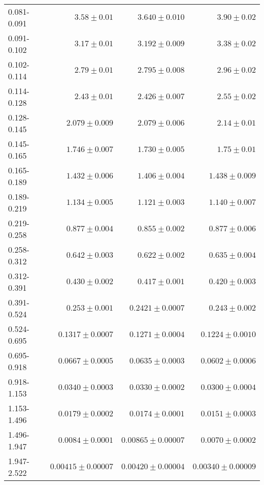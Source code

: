 \begin{table}
\begin{center}
\begin{tabular}{@{}l r r r@{}}
            0.081-0.091  &  $3.58     \pm  0.01$     &  $3.640    \pm  0.010$    &  $3.90     \pm  0.02$     \\
            0.091-0.102  &  $3.17     \pm  0.01$     &  $3.192    \pm  0.009$    &  $3.38     \pm  0.02$     \\
            0.102-0.114  &  $2.79     \pm  0.01$     &  $2.795    \pm  0.008$    &  $2.96     \pm  0.02$     \\
            0.114-0.128  &  $2.43     \pm  0.01$     &  $2.426    \pm  0.007$    &  $2.55     \pm  0.02$     \\
            0.128-0.145  &  $2.079    \pm  0.009$    &  $2.079    \pm  0.006$    &  $2.14     \pm  0.01$     \\
            0.145-0.165  &  $1.746    \pm  0.007$    &  $1.730    \pm  0.005$    &  $1.75     \pm  0.01$     \\
            0.165-0.189  &  $1.432    \pm  0.006$    &  $1.406    \pm  0.004$    &  $1.438    \pm  0.009$    \\
            0.189-0.219  &  $1.134    \pm  0.005$    &  $1.121    \pm  0.003$    &  $1.140    \pm  0.007$    \\
            0.219-0.258  &  $0.877    \pm  0.004$    &  $0.855    \pm  0.002$    &  $0.877    \pm  0.006$    \\
            0.258-0.312  &  $0.642    \pm  0.003$    &  $0.622    \pm  0.002$    &  $0.635    \pm  0.004$    \\
            0.312-0.391  &  $0.430    \pm  0.002$    &  $0.417    \pm  0.001$    &  $0.420    \pm  0.003$    \\
            0.391-0.524  &  $0.253    \pm  0.001$    &  $0.2421   \pm  0.0007$   &  $0.243    \pm  0.002$    \\
            0.524-0.695  &  $0.1317   \pm  0.0007$   &  $0.1271   \pm  0.0004$   &  $0.1224   \pm  0.0010$   \\
            0.695-0.918  &  $0.0667   \pm  0.0005$   &  $0.0635   \pm  0.0003$   &  $0.0602   \pm  0.0006$   \\
            0.918-1.153  &  $0.0340   \pm  0.0003$   &  $0.0330   \pm  0.0002$   &  $0.0300   \pm  0.0004$   \\
            1.153-1.496  &  $0.0179   \pm  0.0002$   &  $0.0174   \pm  0.0001$   &  $0.0151   \pm  0.0003$   \\
            1.496-1.947  &  $0.0084   \pm  0.0001$   &  $0.00865  \pm  0.00007$  &  $0.0070   \pm  0.0002$   \\
            1.947-2.522  &  $0.00415  \pm  0.00007$  &  $0.00420  \pm  0.00004$  &  $0.00340  \pm  0.00009$  \\

\end{tabular}
\end{center}
\end{table}
